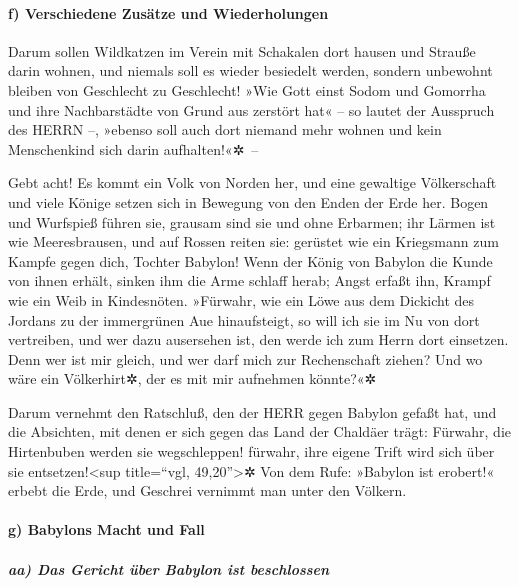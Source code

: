 \hypertarget{f-verschiedene-zusuxe4tze-und-wiederholungen}{%
\paragraph{f) Verschiedene Zusätze und
Wiederholungen}\label{f-verschiedene-zusuxe4tze-und-wiederholungen}}

Darum sollen Wildkatzen im Verein mit Schakalen dort
hausen und Strauße darin wohnen, und niemals soll es wieder besiedelt
werden, sondern unbewohnt bleiben von Geschlecht zu Geschlecht!
»Wie Gott einst Sodom und Gomorrha und ihre Nachbarstädte
von Grund aus zerstört hat« -- so lautet der Ausspruch des HERRN --,
»ebenso soll auch dort niemand mehr wohnen und kein Menschenkind sich
darin aufhalten!«✲~--

Gebt acht! Es kommt ein Volk von Norden her, und eine
gewaltige Völkerschaft und viele Könige setzen sich in Bewegung von den
Enden der Erde her. Bogen und Wurfspieß führen sie,
grausam sind sie und ohne Erbarmen; ihr Lärmen ist wie Meeresbrausen,
und auf Rossen reiten sie: gerüstet wie ein Kriegsmann zum Kampfe gegen
dich, Tochter Babylon! Wenn der König von Babylon die
Kunde von ihnen erhält, sinken ihm die Arme schlaff herab; Angst erfaßt
ihn, Krampf wie ein Weib in Kindesnöten. »Fürwahr, wie
ein Löwe aus dem Dickicht des Jordans zu der immergrünen Aue
hinaufsteigt, so will ich sie im Nu von dort vertreiben, und wer dazu
ausersehen ist, den werde ich zum Herrn dort einsetzen. Denn wer ist mir
gleich, und wer darf mich zur Rechenschaft ziehen? Und wo wäre ein
Völkerhirt✲, der es mit mir aufnehmen könnte?«✲

Darum vernehmt den Ratschluß, den der HERR gegen Babylon
gefaßt hat, und die Absichten, mit denen er sich gegen das Land der
Chaldäer trägt: Fürwahr, die Hirtenbuben werden sie wegschleppen!
fürwahr, ihre eigene Trift wird sich über sie entsetzen!\textless sup
title=``vgl, 49,20''\textgreater✲ Von dem Rufe: »Babylon
ist erobert!« erbebt die Erde, und Geschrei vernimmt man unter den
Völkern.

\hypertarget{g-babylons-macht-und-fall}{%
\paragraph{g) Babylons Macht und Fall}\label{g-babylons-macht-und-fall}}

\hypertarget{aa-das-gericht-uxfcber-babylon-ist-beschlossen}{%
\subparagraph{aa) Das Gericht über Babylon ist
beschlossen}\label{aa-das-gericht-uxfcber-babylon-ist-beschlossen}}

